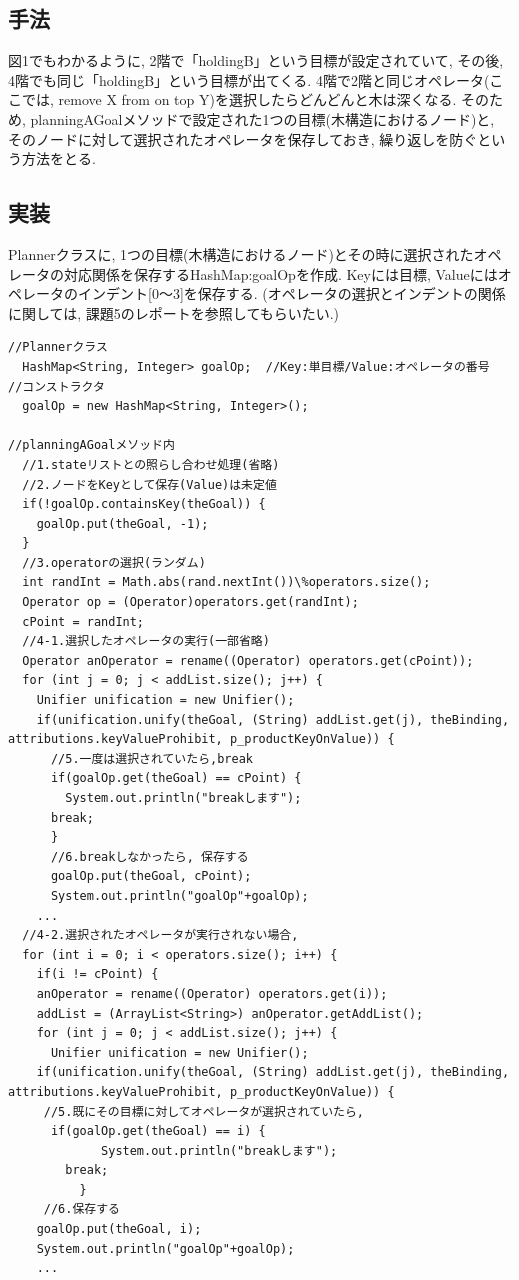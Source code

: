\documentclass[uplatex,12pt]{jsarticle}
\begin{document}
\subsection{手法}
図1でもわかるように, 2階で「holdingB」という目標が設定されていて, その後, 4階でも同じ「holdingB」という目標が出てくる. 4階で2階と同じオペレータ(ここでは, remove X from on top Y)を選択したらどんどんと木は深くなる. そのため, planningAGoalメソッドで設定された1つの目標(木構造におけるノード)と, そのノードに対して選択されたオペレータを保存しておき, 繰り返しを防ぐという方法をとる.

\subsection{実装}
Plannerクラスに, 1つの目標(木構造におけるノード)とその時に選択されたオペレータの対応関係を保存するHashMap:goalOpを作成. Keyには目標, Valueにはオペレータのインデント[0～3]を保存する. (オペレータの選択とインデントの関係に関しては, 課題5のレポートを参照してもらいたい.)

\begin{lstlisting}[caption=目標とオペレータの対応関係の保存, label=src:No1]
//Plannerクラス
  HashMap<String, Integer> goalOp;	//Key:単目標/Value:オペレータの番号
//コンストラクタ
  goalOp = new HashMap<String, Integer>();

//planningAGoalメソッド内
  //1.stateリストとの照らし合わせ処理(省略) 
  //2.ノードをKeyとして保存(Value)は未定値
  if(!goalOp.containsKey(theGoal)) {
    goalOp.put(theGoal, -1);
  }
  //3.operatorの選択(ランダム)
  int randInt = Math.abs(rand.nextInt())\%operators.size();
  Operator op = (Operator)operators.get(randInt);
  cPoint = randInt;
  //4-1.選択したオペレータの実行(一部省略)
  Operator anOperator = rename((Operator) operators.get(cPoint));
  for (int j = 0; j < addList.size(); j++) {
    Unifier unification = new Unifier();
    if(unification.unify(theGoal, (String) addList.get(j), theBinding, attributions.keyValueProhibit, p_productKeyOnValue)) {
      //5.一度は選択されていたら,break
      if(goalOp.get(theGoal) == cPoint) {
        System.out.println("breakします");
	  break;
      }
      //6.breakしなかったら, 保存する
      goalOp.put(theGoal, cPoint);
      System.out.println("goalOp"+goalOp);
	...
  //4-2.選択されたオペレータが実行されない場合,
  for (int i = 0; i < operators.size(); i++) {
    if(i != cPoint) {
    anOperator = rename((Operator) operators.get(i));
    addList = (ArrayList<String>) anOperator.getAddList();
    for (int j = 0; j < addList.size(); j++) {
      Unifier unification = new Unifier();
	if(unification.unify(theGoal, (String) addList.get(j), theBinding, attributions.keyValueProhibit, p_productKeyOnValue)) {
     //5.既にその目標に対してオペレータが選択されていたら,
	  if(goalOp.get(theGoal) == i) {
             System.out.println("breakします");
		break;
          }
     //6.保存する
	goalOp.put(theGoal, i);
	System.out.println("goalOp"+goalOp);
	...
\end{lstlisting}
\end{document}
